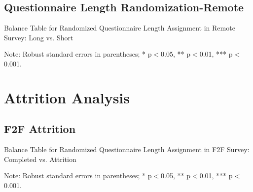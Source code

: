 \documentclass[11pt,harvard]{article}
\begin{document}
	\pagebreak
	
	\subsection{Questionnaire Length Randomization-Remote}
	
	\begin{table}[htbp]
		\centering
		\begin{adjustbox}{max width=\textwidth}
			\begin{threeparttable}
				\caption{Balance Table for Randomized Questionnaire Length Assignment in Remote Survey: Long vs. Short}
				\scriptsize
				 
				\label{tab:CAR_Listing_Demo_Balance_RM_Length}
				\begin{tablenotes}
					\item Note: Robust standard errors in parentheses; * p$<$0.05, ** p$<$0.01, *** p$<$0.001.
				\end{tablenotes}
			\end{threeparttable}
		\end{adjustbox}
	\end{table}
	
	\pagebreak
	
	
\section{Attrition Analysis}
	\subsection{F2F Attrition}
\begin{table}[htbp]
	\centering
	\begin{adjustbox}{max width=\textwidth}
		\begin{threeparttable}
			\caption{Balance Table for Randomized Questionnaire Length Assignment in F2F Survey: Completed vs. Attrition}
			\scriptsize
			 
			\label{tab:CAR_Listing_Demo_Attrition_F2F}
			\begin{tablenotes}
				\item Note: Robust standard errors in parentheses; * p$<$0.05, ** p$<$0.01, *** p$<$0.001.
			\end{tablenotes}
		\end{threeparttable}
	\end{adjustbox}
\end{table}
\end{document}
